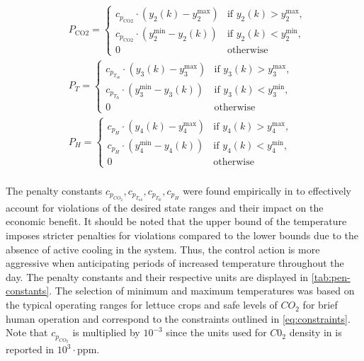 \begin{equation}\label{eq:penalty_terms}
\begin{aligned}
& P_{\text{CO2}} = 
\begin{cases} 
c_{p_{\text{CO2}}} \cdot (y_2(k) - y_2^{\text{max}}) & \text{if } y_2(k) > y_2^{\text{max}} , \\
c_{p_{\text{CO2}}} \cdot (y_2^{\text{min}} - y_2(k)) & \text{if } y_2(k) < y_2^{\text{min}} , \\
0 & \text{otherwise}
\end{cases}
\\
& P_{T} = 
\begin{cases} 
c_{p_{T_{ub}}} \cdot (y_3(k) - y_3^{\text{max}}) & \text{if } y_3(k) > y_3^{\text{max}} , \\
c_{p_{T_{lb}}} \cdot (y_3^{\text{min}} - y_3(k)) & \text{if } y_3(k) < y_3^{\text{min}} , \\
0 & \text{otherwise}
\end{cases}
\\
& P_{H} = 
\begin{cases} 
c_{p_{H}} \cdot (y_4(k) - y_4^{\text{max}}) & \text{if } y_4(k) > y_4^{\text{max}} , \\
c_{p_{H}} \cdot (y_4^{\text{min}} - y_4(k)) & \text{if } y_4(k) < y_4^{\text{min}} , \\
0 & \text{otherwise}
\end{cases}
\\
\end{aligned}
\end{equation}

The penalty constants $c_{p_{CO_2}}, c_{p_{T_{ub}}},c_{p_{T_{lb}}},c_{p_{H}}$ were found empirically in \citet{jansenOptimalControlLettuce2023} to effectively account for violations of the desired state ranges and their impact on the economic benefit. It should be noted that the upper bound of the temperature imposes stricter penalties for violations compared to the lower bounds due to the absence of active cooling in the system. Thus, the control action is more aggressive when anticipating periods of increased temperature throughout the day. The penalty constants and their respective units are displayed in \autoref{tab:pen-constants}. The selection of minimum and maximum temperatures was based on the typical operating ranges for lettuce crops and  safe levels of $CO_2$ for brief human operation and correspond to the constraints outlined in \autoref{eq:constraints}. Note that $c_{p_{CO_2}}$ is multiplied by $10^{-3}$ since the units used for $C0_2$ density in \citet{jansenOptimalControlLettuce2023} is reported in $10^3 \cdot \text{ppm}$.

